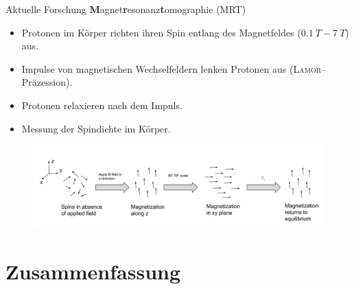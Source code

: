 \documentclass[t,9pt]{beamer}
\begin{document}
        \begin{frame}{Aktuelle Forschung}
                \textbf{M}agnet\textbf{r}esonanz\textbf{t}omographie (MRT)
                \begin{itemize}
                        \item Protonen im Körper richten ihren Spin entlang des Magnetfeldes ($\SI{0.1}{T}-\SI{7}{T}$) aus.
                        \item Impulse von magnetischen Wechselfeldern lenken Protonen aus (\textsc{Lamor}--Präzession).
                        \item Protonen relaxieren nach dem Impuls.
                        \item Messung der Spindichte im Körper.
                \end{itemize}
                \hfill\tiny\cite{Mustafa2023}\normalsize
                \begin{figure}
                        \centering
                        \includegraphics[width=.9\textwidth]{prosi_spin_orientation_relaxation.png}
                        \caption*{\cite{WikiMRI}}
                \end{figure}
        \end{frame}

        \section{Zusammenfassung}
\end{document}
